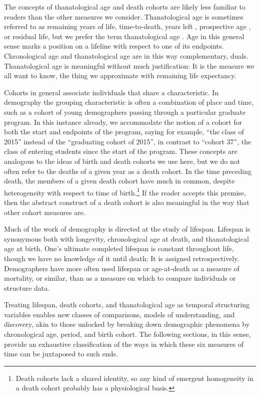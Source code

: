 \documentclass[12pt,oneside,a4paper]{article} %
\begin{document}
The concepts of thanatological age and death cohorts are likely less familiar to
readers than the other measures we consider. Thanatological age is sometimes
referred to as remaining years of life, time-to-death, years left
\citep{vaupel2009life, villavicencioRiffeSymmetires2016}, prospective age
\citep{sanderson2007new}, or residual life, but we prefer the term thanatological age \citep{riffe2015force}. Age in this general sense marks a position on a lifeline with respect to one of its
endpoints. Chronological age and thanatological age are in this way
complementary, duals. Thanatological age is meaningful without much
justification: It is the measure we all want to know, the thing we approximate
with remaining life expectancy.

Cohorts in general associate individuals that share a characteristic. In
demography the grouping characteristic is often a combination of place and time, such as
a cohort of young demographers passing through a particular graduate program.
In this instance already, we accommodate the notion of a cohort for both the
start and endpoints of the program, saying for example, ``the class of 2015''
instead of the ``graduating cohort of 2015'', in contrast to ``cohort 37'', the
 class of entering students since the start of the program. These concepts are analogous to the ideas of
birth and death cohorts we use here, but we do not often refer to the deaths of a given year as a death cohort.
In the time preceding death, the members of a given death cohort have much in common, despite
heterogeneity with respect to time of birth.\footnote{Death cohorts lack a
shared identity, so any kind of emergent homogeneity in a death cohort probably
has a physiological basis.} If the reader accepts this premise, then the
abstract construct of a death cohort is also meaningful in the way that other cohort measures are.

Much of the work of demography is directed at the study of lifespan. Lifespan is
synonymous both with longevity, chronological age at death, and thanatological
age at birth. One's ultimate completed lifespan is constant throughout life,
though we have no knowledge of it until death: It is assigned retrospectively.
Demographers have more often used lifespan or age-at-death as a measure of
mortality, or similar, than as a measure on which to compare individuals or
structure data.

Treating lifespan,
death cohorts, and thanatological age as temporal structuring variables
enables new classes of comparisons, models of understanding, and discovery,
akin to those unlocked by breaking down demographic phenomena by chronological age,
period, and birth cohort. The following sections, in this sense, provide an
exhaustive classification of the ways in which these six measures of time can be juxtaposed to such ends.
\end{document}
